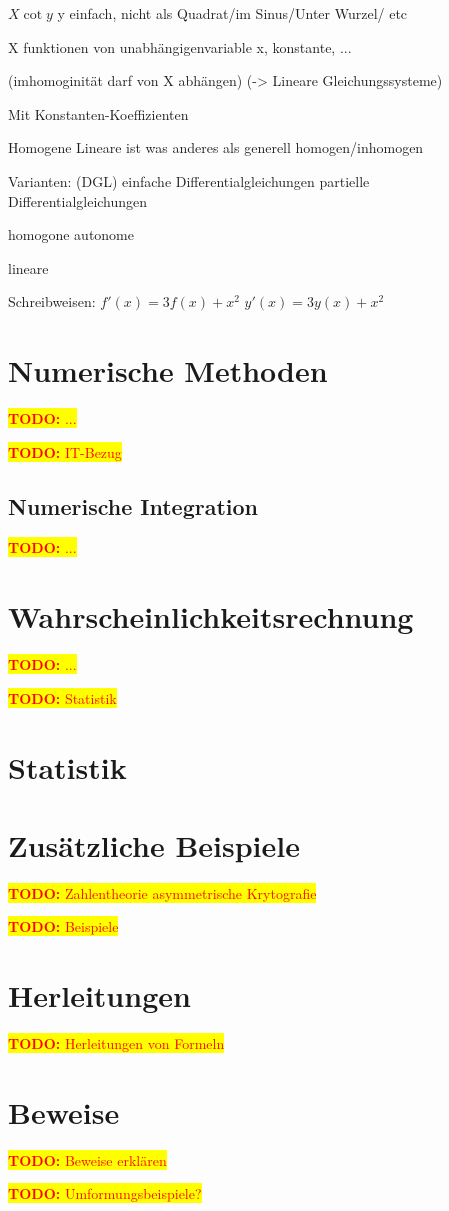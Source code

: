 \documentclass[10pt,a4paper]{article}
\newcommand{\todo}[1]{\begin{flushleft} \colorbox{yellow}{\textcolor{red}{\textbf{TODO:} {#1}}}\end{flushleft} }
\begin{document}
	$ X \cot y $
	y einfach, nicht als Quadrat/im Sinus/Unter Wurzel/ etc
	
	X funktionen von unabhängigenvariable x, konstante, ...
	
	(imhomoginität darf von X abhängen)
	(-> Lineare Gleichungssysteme)
	
	Mit Konstanten-Koeffizienten
	
	
	Homogene Lineare 
	ist was anderes als generell homogen/inhomogen
	



Varianten:
	(DGL)
	einfache Differentialgleichungen
	partielle Differentialgleichungen

	homogone autonome
	
	lineare
	
Schreibweisen:
	$ f'(x) = 3f(x) + x^2 $
	$ y'(x) = 3y(x) + x^2 $
	



\section{Numerische Methoden}

\todo{...}
\todo{IT-Bezug}

\subsection{Numerische Integration}
\todo{...}


\section{Wahrscheinlichkeitsrechnung}
\todo{...}
\todo{Statistik}

\section{Statistik}


\section{Zusätzliche Beispiele}
\todo{Zahlentheorie asymmetrische Krytografie}
\todo{Beispiele}

\section{Herleitungen}
\todo{Herleitungen von Formeln}

\section{Beweise}
\todo{Beweise erklären}

\todo{Umformungsbeispiele?}
\end{document}
